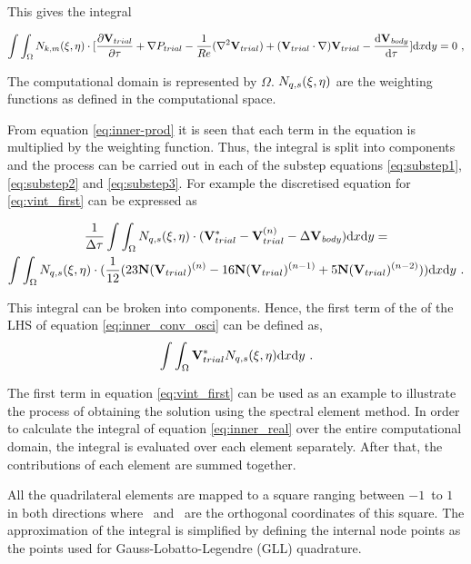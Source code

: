 This gives the integral 

 \begin{equation} \centering
 \label{eq:inner-prod}
 \int\int_{\Omega}N_{k,m}(\compone,\comptwo)\cdot[\pderiv{\Vtrial}{\tau} +\grad{\Ptrial} - \frac{1}{\reynoldsnumber}(\gradsq{\Vtrial}) + (\Vtrial\cdot\nabla)\Vtrial - \accframe]\mathrm{d}x\mathrm{d}y = 0 ~,
 \end{equation}
 
The computational domain is represented by $\Omega$. $N_{q,s}(\xi,\eta)$ are the weighting functions as defined in the computational space.

From equation \ref{eq:inner-prod} it is seen that each term in the equation is multiplied by the weighting function. Thus, the integral is split into components and the process can be carried out in each of the substep equations \ref{eq:substep1}, \ref{eq:substep2} and \ref{eq:substep3}. For example the discretised equation for \ref{eq:vint_first} can be expressed as

\setlength{\multlinegap}{0.2\textwidth}
\begin{multline} 
\label{eq:inner_conv_osci}
\frac{1}{\Delta\tau}\int\int_{\Omega}N_{q,s}(\xi,\eta)\cdot(\mathbf{V}_{trial}^{*} - \mathbf{V}_{trial}^{(n)} - \Delta\mathbf{V}_{\mathit{body}})\mathrm{d}x\mathrm{d}y = \\
\int\int_{\Omega}N_{q,s}(\xi,\eta)\cdot(\frac{1}{12}(23\mathbf{N}(\mathbf{V}_{trial})^{(n)} - 16\mathbf{N}(\mathbf{V}_{trial})^{(n-1)} + 5\mathbf{N}(\mathbf{V}_{trial})^{(n-2)}))\mathrm{d}x\mathrm{d}y ~.
\end{multline}

 This integral can be broken into components. Hence, the first term of the of the LHS of equation \ref{eq:inner_conv_osci} can be defined as,  
\begin{equation} \centering
\label{eq:inner_real}
\int\int_{\Omega}\Vtrial^{*} N_{q,s}(\compone,\comptwo)\mathrm{d}x\mathrm{d}y ~.
\end{equation}


The first term in equation \ref{eq:vint_first} can be used as an example to illustrate the process of obtaining the solution using the spectral element method. In order to calculate the integral of equation \ref{eq:inner_real}  over the entire computational domain, the integral is evaluated over each element separately. After that, the contributions of each element are summed together. 

All the quadrilateral elements are mapped to a square ranging between $-1$\ to $1$ in both directions where \compone\ and \comptwo\ are the orthogonal coordinates of this square. The approximation of the integral is simplified by defining the internal node points as the points used for Gauss-Lobatto-Legendre (GLL) quadrature.

